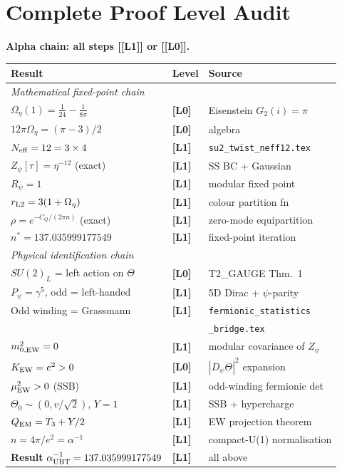 \documentclass[12pt,a4paper]{article}
\theoremstyle{remark}\newtheorem{remark}[theorem]{Remark}
\newcommand{\Lz}{\textbf{[L0]}}
\newcommand{\Lo}{\textbf{[L1]}}
\begin{document}
\section{Complete Proof Level Audit}
\label{sec:audit}

\begin{resultbox}
\textbf{Alpha chain: all steps [\Lo] or [\Lz].}

\begin{center}
\footnotesize
\renewcommand{\arraystretch}{1.3}
\begin{tabular}{p{5.5cm}p{1.6cm}p{5cm}}
\toprule
Result & Level & Source \\
\midrule
\multicolumn{3}{l}{\textit{Mathematical fixed-point chain}} \\
$\Omega_\eta(1)=\tfrac{1}{24}-\tfrac{1}{8\pi}$ & \Lz & Eisenstein $G_2(i)=\pi$ \\
$12\pi\Omega_\eta=(\pi{-}3)/2$ & \Lz & algebra \\
$N_{\rm eff}=12=3\times4$ & \Lo & \texttt{su2\_twist\_neff12.tex} \\
$Z_\psi[\tau]=\eta^{-12}$ (exact) & \Lo & SS BC + Gaussian \\
$R_\psi=1$ & \Lo & modular fixed point \\
$r_{\rm L2}=3(1+\Omega_\eta)$ & \Lo & colour partition fn \\
$\rho=e^{-C_Q/(2\pi n)}$ (exact) & \Lo & zero-mode equipartition \\
$n^*=137.035999177549$ & \Lo & fixed-point iteration \\
\midrule
\multicolumn{3}{l}{\textit{Physical identification chain}} \\
$SU(2)_L$ = left action on $\Theta$ & \Lz & T2\_GAUGE Thm.~1 \\
$P_\psi=\gamma^5$, odd = left-handed & \Lo & 5D Dirac + $\psi$-parity \\
Odd winding = Grassmann & \Lo & \texttt{fermionic\_statistics}\\& & \texttt{\_bridge.tex} \\
$m^2_{0,\rm EW}=0$ & \Lo & modular covariance of $Z_\psi$ \\
$K_{\rm EW}=e^2>0$ & \Lz & $|D_\psi\Theta|^2$ expansion \\
$\mu^2_{\rm EW}>0$ (SSB) & \Lo & odd-winding fermionic det \\
$\Theta_0\sim(0,v/\sqrt2)$, $Y=1$ & \Lo & SSB + hypercharge \\
$Q_{\rm EM}=T_3+Y/2$ & \Lo & EW projection theorem \\
$n=4\pi/e^2=\alpha^{-1}$ & \Lo & compact-U(1) normalisation \\
\midrule
\textbf{Result} $\alpha^{-1}_{\rm UBT}=137.035999177549$ & \Lo & all above \\
\bottomrule
\end{tabular}
\end{center}


\end{resultbox}
\end{document}
